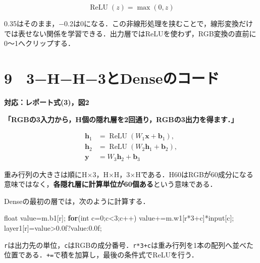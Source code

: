 \documentclass[
  14pt,
  a5paper,
]{extarticle}
\newenvironment{Shaded}{}{}
\newcommand{\BuiltInTok}[1]{\textcolor[rgb]{0.00,0.50,0.00}{#1}}
\newcommand{\ControlFlowTok}[1]{\textcolor[rgb]{0.00,0.44,0.13}{\textbf{#1}}}
\newcommand{\DataTypeTok}[1]{\textcolor[rgb]{0.56,0.13,0.00}{#1}}
\newcommand{\DecValTok}[1]{\textcolor[rgb]{0.25,0.63,0.44}{#1}}
\newcommand{\FloatTok}[1]{\textcolor[rgb]{0.25,0.63,0.44}{#1}}
\newcommand{\NormalTok}[1]{#1}
\newcommand{\OperatorTok}[1]{\textcolor[rgb]{0.40,0.40,0.40}{#1}}
\begin{document}
\[\operatorname{ReLU}(z)=\max(0,z)\]

0.35はそのまま，−0.2は0になる．この非線形処理を挟むことで，線形変換だけでは表せない関係を学習できる．出力層ではReLUを使わず，RGB変換の直前に0〜1へクリップする．

\newpage

\section{9　3−H−H−3とDenseのコード}\label{hh3ux3068denseux306eux30b3ux30fcux30c9}

\textbf{対応：レポート式(3)，図2}

\textbf{「RGBの3入力から，H個の隠れ層を2回通り，RGBの3出力を得ます．」}

\[\begin{aligned}
\boldsymbol h_1&=\operatorname{ReLU}(W_1\boldsymbol x+\boldsymbol b_1),\\
\boldsymbol h_2&=\operatorname{ReLU}(W_2\boldsymbol h_1+\boldsymbol b_2),\\
\boldsymbol y&=W_3\boldsymbol h_2+\boldsymbol b_3
\end{aligned}\]

重み行列の大きさは順にH×3，H×H，3×Hである．H60はRGBが60成分になる意味ではなく，\textbf{各隠れ層に計算単位が60個ある}という意味である．

Denseの最初の層では，次のように計算する．

\begin{Shaded}
\begin{Highlighting}[]
\DataTypeTok{float}\NormalTok{ value}\OperatorTok{=}\NormalTok{m}\OperatorTok{.}\NormalTok{b1}\OperatorTok{[}\NormalTok{r}\OperatorTok{];}
\ControlFlowTok{for}\OperatorTok{(}\DataTypeTok{int}\NormalTok{ c}\OperatorTok{=}\DecValTok{0}\OperatorTok{;}\NormalTok{c}\OperatorTok{\textless{}}\DecValTok{3}\OperatorTok{;}\NormalTok{c}\OperatorTok{++)}\NormalTok{ value}\OperatorTok{+=}\NormalTok{m}\OperatorTok{.}\NormalTok{w1}\OperatorTok{[}\NormalTok{r}\OperatorTok{*}\DecValTok{3}\OperatorTok{+}\NormalTok{c}\OperatorTok{]*}\NormalTok{input}\OperatorTok{[}\NormalTok{c}\OperatorTok{];}
\NormalTok{layer1}\OperatorTok{[}\NormalTok{r}\OperatorTok{]=}\NormalTok{value}\OperatorTok{\textgreater{}}\FloatTok{0.0}\BuiltInTok{f}\OperatorTok{?}\NormalTok{value}\OperatorTok{:}\FloatTok{0.0}\BuiltInTok{f}\OperatorTok{;}
\end{Highlighting}
\end{Shaded}

\texttt{r}は出力先の単位，\texttt{c}はRGBの成分番号．\texttt{r*3+c}は重み行列を1本の配列へ並べた位置である．\texttt{+=}で積を加算し，最後の条件式でReLUを行う．
\end{document}

